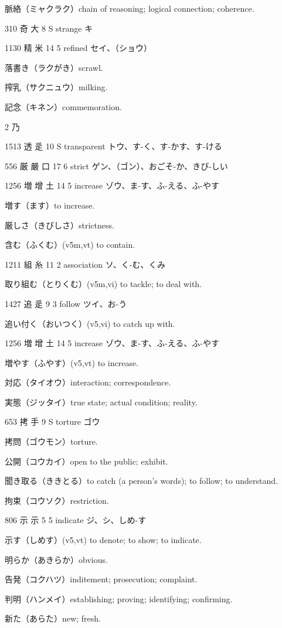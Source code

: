 脈絡（ミャクラク）chain of reasoning; logical connection; coherence.

310	奇		大	8	S		strange	キ

1130	精		米	14	5		refined	セイ、（ショウ）

落書き（ラクがき）scrawl.

搾乳（サクニュウ）milking.

記念（キネン）commemoration.

2 乃

1513	透		辵	10	S		transparent	トウ、す-く、す-かす、す-ける

556	厳	嚴	口	17	6		strict	ゲン、（ゴン）、おごそ-か、きび-しい

1256	増	增	土	14	5		increase	ゾウ、ま-す、ふ-える、ふ-やす

増す（ます）to increase.

厳しさ（きびしさ）strictness.

含む（ふくむ）(v5m,vt) to contain.

1211	組		糸	11	2		association	ソ、く-む、くみ

取り組む（とりくむ）(v5m,vi) to tackle; to deal with.

1427	追		辵	9	3		follow	ツイ、お-う

追い付く（おいつく）(v5,vi) to catch up with.

1256	増	增	土	14	5		increase	ゾウ、ま-す、ふ-える、ふ-やす

増やす（ふやす）(v5,vt) to increase.

対応（タイオウ）interaction; correspondence.

実態（ジッタイ）true state; actual condition; reality.

653	拷		手	9	S		torture	ゴウ

拷問（ゴウモン）torture.

公開（コウカイ）open to the public; exhibit.

聞き取る（ききとる）to catch (a person's words); to follow; to understand.

拘束（コウソク）restriction.

806	示		示	5	5		indicate	ジ、シ、しめ-す

示す（しめす）(v5,vt) to denote; to show; to indicate.

明らか（あきらか）obvious.

告発（コクハツ）inditement; prosecution; complaint.

判明（ハンメイ）establishing; proving; identifying; confirming.

新た（あらた）new; fresh.

